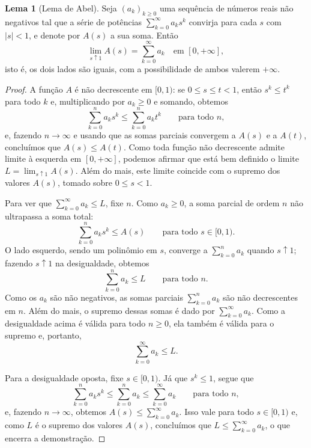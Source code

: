 \documentclass[12pt,portuguese]{article}
\theoremstyle{definition}
\newtheorem{lemma}[lemma]{Lema}
\theoremstyle{plainexercise}
\theoremstyle{starredexercise}
\theoremstyle{definition}
\begin{document}
\begin{lemma}[Lema de Abel]\label{lem:abel}
Seja $(a_k)_{k\geqslant 0}$ uma sequência de números reais não negativos
tal que a série de potências $\sum_{k=0}^{\infty}a_ks^k$ convirja para
cada $s$ com $|s|<1$, e denote por $A(s)$ a sua soma. Então
\[
\lim_{s\uparrow 1}A(s)=\sum_{k=0}^{\infty}a_k
\quad\text{em }[0,+\infty],
\]
isto é, os dois lados são iguais, com a possibilidade de ambos valerem
$+\infty$.
\end{lemma}

\begin{proof}
A função $A$ é não decrescente em $[0,1)$: se $0\leqslant s\leqslant t<1$,
então $s^k\leqslant t^k$ para todo $k$ e, multiplicando por $a_k\geqslant 0$
e somando, obtemos
\[
\sum_{k=0}^{n}a_ks^k\leqslant\sum_{k=0}^{n}a_kt^k
\qquad\text{para todo } n,
\]
e, fazendo $n\to\infty$ e usando que as somas parciais convergem a $A(s)$ e
a $A(t)$, concluímos que $A(s)\leqslant A(t)$. Como toda função não decrescente admite
limite à esquerda em $[0,+\infty]$, podemos afirmar que
está bem definido o limite $L=\lim_{s\uparrow 1}A(s)$.
Além do mais, este limite coincide com o supremo dos valores $A(s)$, tomado sobre $0\leqslant s<1$.

Para ver que $\sum_{k=0}^{\infty}a_k\leqslant L$, fixe $n$. Como
$a_k\geqslant 0$, a soma parcial de ordem $n$ não ultrapassa a soma
total:
\[
\sum_{k=0}^{n}a_ks^k\leqslant A(s)
\qquad\text{para todo } s\in[0,1).
\]
O lado esquerdo, sendo um polinômio em $s$, converge a
$\sum_{k=0}^{n}a_k$ quando $s\uparrow 1$; fazendo $s\uparrow 1$ na
desigualdade, obtemos
\[
\sum_{k=0}^{n}a_k\leqslant L
\qquad\text{para todo } n.
\]
Como os $a_k$ são não negativos, as somas parciais $\sum_{k=0}^{n}a_k$
são não decrescentes em $n$. Além do mais, o supremo dessas somas é dado por
$\sum_{k=0}^{\infty}a_k$. Como a desigualdade acima é válida para todo $n\geqslant 0$,
ela também é válida para o supremo e, portanto,
\[
\sum_{k=0}^{\infty}a_k\leqslant L.
\]

Para a desigualdade oposta, fixe $s\in[0,1)$. Já que $s^k\leqslant 1$, segue que
\[
\sum_{k=0}^{n}a_ks^k\leqslant\sum_{k=0}^{n}a_k\leqslant\sum_{k=0}^{\infty}a_k
\qquad\text{para todo } n,
\]
e, fazendo $n\to\infty$, obtemos $A(s)\leqslant\sum_{k=0}^{\infty}a_k$.
Isso vale para todo $s\in[0,1)$ e, como $L$ é o supremo dos valores
$A(s)$, concluímos que $L\leqslant\sum_{k=0}^{\infty}a_k$, o que encerra a
demonstração.
\end{proof}
\end{document}
